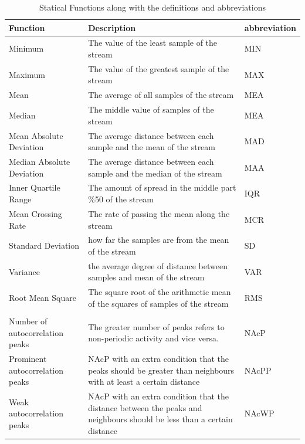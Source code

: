 \documentclass[journal,article,submit,moreauthors,pdftex]{Definitions/mdpi}
\begin{document}
\begin{table}[H]
	\caption{Statical Functions along with the definitions and abbreviations }
	\centering
	\begin{tabular}{p{3.4cm}p{6cm}p{1.3cm}}
		\toprule
		\textbf{Function} & \textbf{Description} & \textbf{{\scriptsize abbreviation}} \\
		\midrule
		Minimum & {\scriptsize The value of the least sample of the stream}& MIN\\
		Maximum & {\scriptsize The value of the greatest sample of the stream}& MAX\\
		Mean&  {\scriptsize The average of all samples of the stream}& MEA\\
		Median&  {\scriptsize The middle value of samples of the stream}& MEA\\
		{\footnotesize Mean Absolute Deviation}& {\scriptsize The average distance between each sample and the mean of the stream}& MAD\\
		{\footnotesize Median Absolute Deviation}& {\scriptsize The average distance between each sample and the median of the stream}& MAA\\
		Inner Quartile Range  & {\scriptsize The amount of spread in the middle part \%50 of the stream}& IQR\\
		Mean Crossing Rate& {\scriptsize The rate of passing the mean along the stream}& MCR\\
		Standard Deviation& {\scriptsize how far the samples are from the mean of the stream}& SD\\
		Variance& {\scriptsize the average degree of distance between samples and mean of the stream}& VAR\\
		Root Mean Square& {\scriptsize The square root of the arithmetic mean of the squares of samples of the stream}& RMS\\
		&{\scriptsize } & \\
		Number of autocorrelation peaks& {\scriptsize The greater number of peaks refers to non-periodic activity and vice versa. }& NAcP\\
		Prominent autocorrelation peaks&{\scriptsize NAcP with an extra condition that the peaks should be greater than neighbours with at least a certain distance} & NAcPP \\
		Weak autocorrelation peaks&{\scriptsize NAcP with an extra condition that the distance between the peaks and neighbours should be less than a certain distance} & NAcWP \\

\end{tabular}
\end{table}
\end{document}
